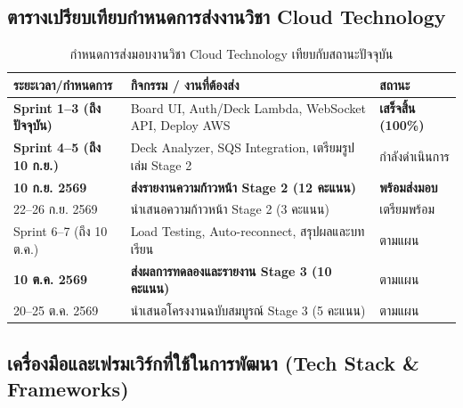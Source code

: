 \documentclass[12pt,a4paper]{article}
\begin{document}
\subsection{ตารางเปรียบเทียบกำหนดการส่งงานวิชา Cloud Technology}

\begin{table}[H]
\centering
\small
\begin{tabular}{p{4.5cm} p{6.5cm} p{3.5cm}}
\toprule
\textbf{ระยะเวลา/กำหนดการ} & \textbf{กิจกรรม / งานที่ต้องส่ง} & \textbf{สถานะ} \\
\midrule
\textbf{Sprint 1--3 (ถึงปัจจุบัน)} & Board UI, Auth/Deck Lambda, WebSocket API, Deploy AWS & \textbf{เสร็จสิ้น (100\%)} \\
\textbf{Sprint 4--5 (ถึง 10 ก.ย.)} & Deck Analyzer, SQS Integration, เตรียมรูปเล่ม Stage 2 & กำลังดำเนินการ \\
\textbf{10 ก.ย. 2569} & \textbf{ส่งรายงานความก้าวหน้า Stage 2 (12 คะแนน)} & \textbf{พร้อมส่งมอบ} \\
22--26 ก.ย. 2569 & นำเสนอความก้าวหน้า Stage 2 (3 คะแนน) & เตรียมพร้อม \\
Sprint 6--7 (ถึง 10 ต.ค.) & Load Testing, Auto-reconnect, สรุปผลและบทเรียน & ตามแผน \\
\textbf{10 ต.ค. 2569} & \textbf{ส่งผลการทดลองและรายงาน Stage 3 (10 คะแนน)} & ตามแผน \\
20--25 ต.ค. 2569 & นำเสนอโครงงานฉบับสมบูรณ์ Stage 3 (5 คะแนน) & ตามแผน \\
\bottomrule
\end{tabular}
\caption{กำหนดการส่งมอบงานวิชา Cloud Technology เทียบกับสถานะปัจจุบัน}
\end{table}

\subsection{เครื่องมือและเฟรมเวิร์กที่ใช้ในการพัฒนา (Tech Stack \& Frameworks)}
\end{document}
